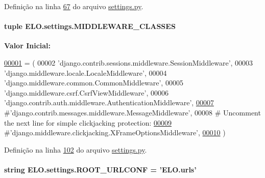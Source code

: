 Definição na linha \hyperlink{settings_8py_source_l00067}{67} do arquivo \hyperlink{settings_8py_source}{settings.\-py}.

\hypertarget{namespaceELO_1_1settings_a968380d6242dca6cc82acb1d806c703d}{
\paragraph[{M\-I\-D\-D\-L\-E\-W\-A\-R\-E\-\_\-\-C\-L\-A\-S\-S\-E\-S}]{\setlength{\rightskip}{0pt plus 5cm}tuple E\-L\-O.\-settings.\-M\-I\-D\-D\-L\-E\-W\-A\-R\-E\-\_\-\-C\-L\-A\-S\-S\-E\-S}}\label{namespaceELO_1_1settings_a968380d6242dca6cc82acb1d806c703d}
{\bfseries Valor Inicial\-:}
\begin{DoxyCode}
\hypertarget{namespaceELO_1_1settings_l00001}{}\hyperlink{namespaceELO_1_1settings}{00001} = (
00002     \textcolor{stringliteral}{'django.contrib.sessions.middleware.SessionMiddleware'},
00003     \textcolor{stringliteral}{'django.middleware.locale.LocaleMiddleware'},
00004     \textcolor{stringliteral}{'django.middleware.common.CommonMiddleware'},
00005     \textcolor{stringliteral}{'django.middleware.csrf.CsrfViewMiddleware'},
00006     \textcolor{stringliteral}{'django.contrib.auth.middleware.AuthenticationMiddleware'},
\hypertarget{namespaceELO_1_1settings_l00007}{}\hyperlink{namespaceELO_1_1settings_a7730264ddd478343e0f282f36d4a5ab4}{00007}     \textcolor{comment}{#'django.contrib.messages.middleware.MessageMiddleware',}
00008     \textcolor{comment}{# Uncomment the next line for simple clickjacking protection:}
\hypertarget{namespaceELO_1_1settings_l00009}{}\hyperlink{namespaceELO_1_1settings_a62f457ac29cc6f3e85282c71ce3b4f26}{00009}     \textcolor{comment}{#'django.middleware.clickjacking.XFrameOptionsMiddleware',}
\hypertarget{namespaceELO_1_1settings_l00010}{}\hyperlink{namespaceELO_1_1settings_a014930e0bf77feccc65c20212593381e}{00010} )
\end{DoxyCode}


Definição na linha \hyperlink{settings_8py_source_l00102}{102} do arquivo \hyperlink{settings_8py_source}{settings.\-py}.

\hypertarget{namespaceELO_1_1settings_a9c32eb39b369ab243858f8bd495e698b}{
\paragraph[{R\-O\-O\-T\-\_\-\-U\-R\-L\-C\-O\-N\-F}]{\setlength{\rightskip}{0pt plus 5cm}string E\-L\-O.\-settings.\-R\-O\-O\-T\-\_\-\-U\-R\-L\-C\-O\-N\-F = 'E\-L\-O.\-urls'}}\label{namespaceELO_1_1settings_a9c32eb39b369ab243858f8bd495e698b}


